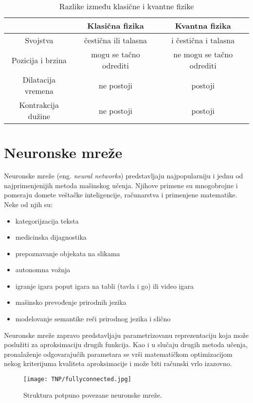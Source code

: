\documentclass[a4paper]{article}
\begin{document}
\begin{table}[h!]
\begin{center}
{\footnotesize
\begin{tabular}{|c|c|c|} \hline
 & Klasična fizika& Kvantna fizika\\ \hline
Svojstva& čestična ili talasna & i čestična i talasna\\ \hline
Pozicija i brzina& mogu se tačno odrediti& ne mogu se  tačno odrediti\\ \hline 
Dilatacija vremena& ne postoji & postoji \\ \hline
Kontrakcija dužine& ne postoji& postoji\\ \hline
\end{tabular}
\caption{Razlike između klasične i kvantne fizike}
\label{tab:tabela1}
}
\end{center}
\end{table}





\section{Neuronske mreže}
\label{sec:naslov1}
Neuronske mreže (eng. {\textit{neural networks}}) predstavljaju najpopularniju i jednu od najprimenjenijih metoda mašinskog učenja. Njihove primene su mnogobrojne i pomeraju domete veštačke inteligencije, računarstva i primenjene matematike. Neke od njih su:
\begin{itemize}
  \item kategorijzacija teksta
  \item medicinska dijagnostika
  \item prepoznavanje objekata na slikama
  \item autonomna vožnja
  \item igranje igara poput igara na tabli (tavla i go) ili video igara
  \item mašinsko prevođenje prirodnih jezika
  \item modelovanje semantike reči prirodnog jezika i slično
\end{itemize}
Neuronske mreže zapravo predstavljaju parametrizovanu reprezentaciju koja može poslužiti za aproksimaciju drugih funkcija. Kao i u slučaju drugih metoda učenja, pronalaženje odgovarajućih parametara se vrši matematičkom optimizacijom nekog kriterijuma kvaliteta aproksimacije i može biti računski vrlo izazovno.

\begin{figure}[h!]
\begin{center}
\texttt{[image: TNP/fullyconnected.jpg]}
\end{center}
\caption{Struktura potpuno povezane neuronske mreže.}
\label{fig:fullyconnected}
\end{figure}
\end{document}
